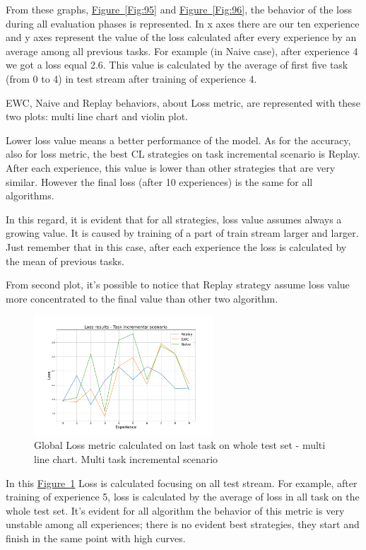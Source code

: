 \documentclass[english, LaM, oneside]{sapthesis}%
\begin{document}
From these graphs, \hyperref[Fig:95]{Figure~\ref*{Fig:95}} and \hyperref[Fig:96]{Figure~\ref*{Fig:96}}, the behavior of the loss during all evaluation phases is represented. In x axes there are our ten experience and y axes represent the value of the loss calculated after every experience by an average among all previous tasks. For example (in Naive case), after experience 4 we got a loss equal 2.6. This value is calculated by the average of first five task (from 0 to 4) in test stream after training of experience 4.

EWC, Naive and Replay behaviors, about Loss metric, are represented with these two plots: multi line chart and violin plot.

Lower loss value means a better performance of the model. As for the accuracy, also for loss metric, the best CL strategies on task incremental scenario is Replay. After each experience, this value is lower than other strategies that are very similar. However the final loss (after 10 experiences) is the same for all algorithms.

In this regard, it is evident that for all strategies, loss value assumes always a growing value. It is caused by training of a part of train stream larger and larger. Just remember that in this case, after each experience the loss is calculated by the mean of previous tasks.

From second plot, it's possible to notice that Replay strategy assume loss value more concentrated to the final value than other two algorithm.

\begin{figure}[!h]

     \centering
     \includegraphics[width=0.60\textwidth]{overview_loss_nc.png}
     \caption{Global Loss metric calculated on last task on whole test set - multi line chart. Multi task incremental scenario}\label{Fig:97}
   
\end{figure}
In this \hyperref[Fig:97]{Figure~\ref*{Fig:97}} Loss is calculated focusing on all test stream. For example, after training of experience 5, loss is calculated by the average of loss in all task on the whole test set. It's evident for all algorithm the behavior of this metric is very unstable among all experiences; there is no evident best strategies, they start and finish in the same point with high curves. 
\end{document}

